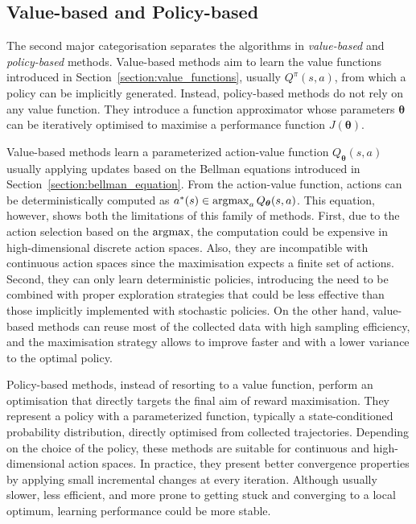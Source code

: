 \subsection{Value-based and Policy-based}

The second major categorisation separates the algorithms in \emph{value-based} and \emph{policy-based} methods.
Value-based methods aim to learn the value functions introduced in Section~\ref{section:value_functions}, usually $Q^\pi(s, a)$, from which a policy can be implicitly generated.
Instead, policy-based methods do not rely on any value function.
They introduce a function approximator whose parameters $\boldsymbol{\theta}$ can be iteratively optimised to maximise a performance function $J(\boldsymbol{\theta})$.

Value-based methods learn a parameterized action-value function $Q_{\boldsymbol{\theta}}(s, a)$ usually applying updates based on the Bellman equations introduced in Section~\ref{section:bellman_equation}.
From the action-value function, actions can be deterministically computed as $a^*(s) \in \operatorname*{argmax}_a Q_{\boldsymbol{\theta}}(s, a)$.
This equation, however, shows both the limitations of this family of methods.
First, due to the action selection based on the $\operatorname*{argmax}$, the computation could be expensive in high-dimensional discrete action spaces.
Also, they are incompatible with continuous action spaces since the maximisation expects a finite set of actions.
Second, they can only learn deterministic policies, introducing the need to be combined with proper exploration strategies that could be less effective than those implicitly implemented with stochastic policies.
On the other hand, value-based methods can reuse most of the collected data with high sampling efficiency, and the maximisation strategy allows to improve faster and with a lower variance to the optimal policy.

Policy-based methods, instead of resorting to a value function, perform an optimisation that directly targets the final aim of reward maximisation.
They represent a policy with a parameterized function, typically a state-conditioned probability distribution, directly optimised from collected trajectories.
Depending on the choice of the policy, these methods are suitable for continuous and high-dimensional action spaces.
In practice, they present better convergence properties by applying small incremental changes at every iteration.
Although usually slower, less efficient, and more prone to getting stuck and converging to a local optimum, learning performance could be more stable.

